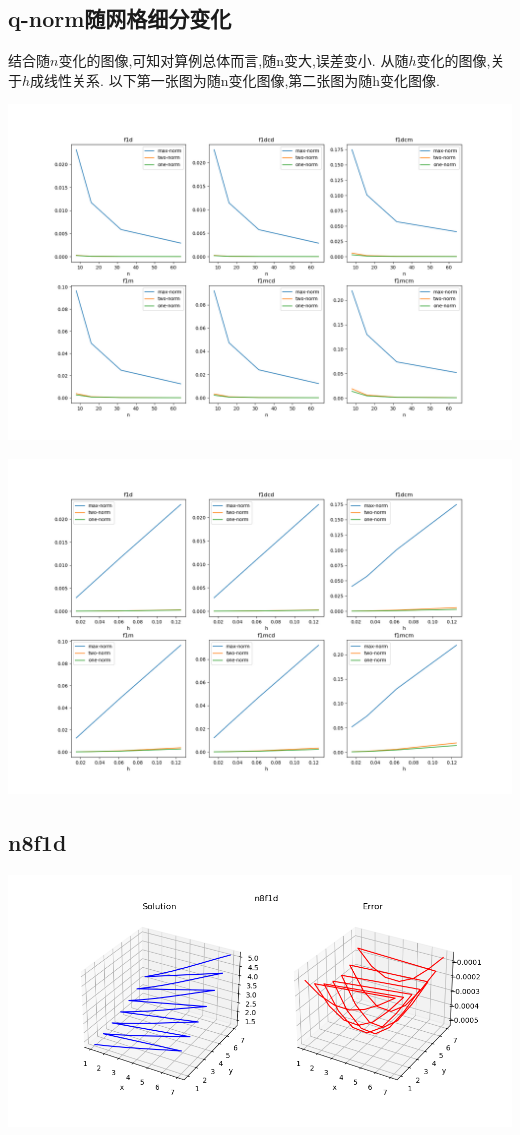 \subsection{q-norm随网格细分变化}

结合随$n$变化的图像,可知对算例总体而言,随n变大,误差变小.
从随$h$变化的图像,关于$h$成线性关系.
以下第一张图为随n变化图像,第二张图为随h变化图像.

\includegraphics[scale=0.4]{../../image/nnorm.png}

\includegraphics[scale=0.4]{../../image/hnorm.png}

\subsection*{n8f1d}
\includegraphics[scale=0.6]{../../image/n8f1d.png}
